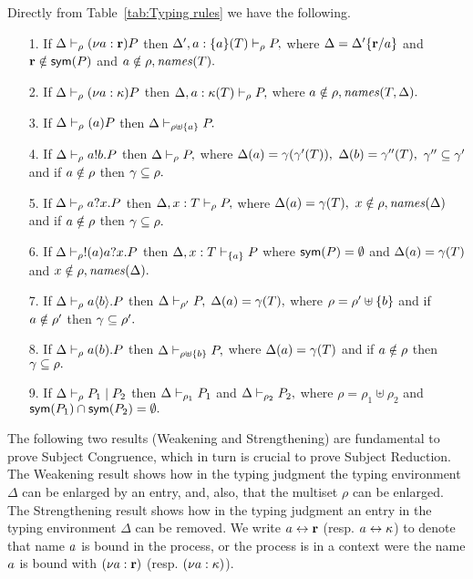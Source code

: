 \begin{lemma}\label{lemm:Inv.Lemma}
Directly from Table~\ref{tab:Typing rules} we have the following.
\begin{itemize}
\item[1.] If $ \Delta\vdash_\rho (\nu a: {\mathbf{r}})P$ then  $ \Delta', a:\{a\}(T)\vdash_\rho P ,$ where $\Delta=\Delta'\{{\mathbf{r}}/a\}$ and ${\mathbf{r}}\notin \mathsf{sym}(P)$ and $a\notin\rho, \mathit{names} (T).$ 
\item[2.] If $ \Delta\vdash_\rho (\nu a: {\mathbf{\kappa}})P$ then  $ \Delta, a:{\mathbf{\kappa}}(T)\vdash_\rho P ,$ where  $a\notin\rho, \mathit{names} (T, \Delta).$ 
\item[3.] If $ \Delta\vdash_\rho (a)P$ then $ \Delta\vdash_{\rho\uplus \{a\}} P.$ 
\item[4.] If $ \Delta\vdash_\rho a!b.P$ then $ \Delta\vdash_{\rho} P,$ where $\Delta(a)=\gamma(\gamma'(T)),$ $\Delta(b)=\gamma''(T),$ 	 $\gamma''\subseteq \gamma'$ and if $a\notin\rho$ then $\gamma\subseteq\rho.$
\item[5.] If $ \Delta\vdash_\rho a?x.P$ then $ \Delta, x:T \vdash_{\rho} P,$ where $\Delta(a)=\gamma(T),$ $x\notin\rho, \mathit{names}(\Delta)$ and if $a\notin\rho$ then $\gamma\subseteq\rho.$
\item[6.] If $ \Delta\vdash_\rho !(a)a?x.P$ then $ \Delta, x: T \vdash_{\{a\}} P$ where $\mathsf{sym}(P)=\emptyset$ and $\Delta(a)=\gamma(T)$ and $x \notin \rho, \mathit{names}(\Delta).$
\item[7.] If $\Delta\vdash_\rho a\langle b\rangle.P$ then $\Delta\vdash_{\rho'} P,$ $\Delta(a)=\gamma(T),$ where $\rho=\rho'\uplus\{b\}$ and if $a\notin\rho'$ then $\gamma \subseteq\rho'.$
\item[8.] If $ \Delta\vdash_\rho a(b).P$ then $ \Delta\vdash_{\rho\uplus\{b\}} P,$ where $\Delta(a)=\gamma(T)$ and if $a\notin\rho$ then $\gamma \subseteq\rho.$
\item[9.] If $ \Delta\vdash_{\rho} P_1 \;|\;P_2$ then $ \Delta\vdash_{\rho_1}P_1$ and $ \Delta\vdash_{\rho_2} P_2,$ where $\rho=\rho_1\uplus\rho_2$ and $\mathsf{sym}(P_1) \cap \mathsf{sym}(P_2)=\emptyset.$
\end{itemize}
\end{lemma}

The following two results (Weakening and Strengthening) are fundamental to prove Subject Congruence, which in turn is crucial to prove Subject Reduction. The Weakening result shows how in the typing judgment the typing environment $\Delta$ can be enlarged by an entry, and, also, that the multiset $\rho$ can be enlarged. The Strengthening result shows how in the typing judgment an entry in the typing environment $\Delta$ can be removed.
We write $a \leftrightarrow {\mathbf{r}}$ (resp. $a \leftrightarrow {\mathbf{\kappa}}$) to denote that name $a$ is bound in the process, or the process is in a context were the name $a$ is bound with $(\nu a :{\mathbf{r}})$ (resp. $(\nu a: {\mathbf{\kappa}})$). 

